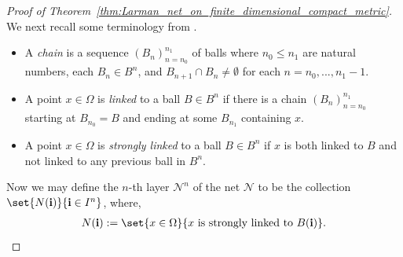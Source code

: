 \begin{proof}[Proof of Theorem~\ref{thm:Larman_net_on_finite_dimensional_compact_metric}]
    We next recall some terminology from \cite{Lar67}.
    \begin{itemize}
        \item A \textit{chain} is a sequence $(B_n)_{n = n_0}^{n_1}$ of balls where $n_0 \leq n_1$ are natural numbers, each $B_n \in B^n$, and $B_{n + 1} \cap B_{n} \neq \emptyset$ for each $n = n_0, ..., n_1 - 1$.
        \item A point $x \in \Omega$ is \textit{linked} to a ball $B \in B^n$ if there is a chain $(B_n)_{n = n_0}^{n_1}$ starting at $B_{n_0} = B$ and ending at some $B_{n_1}$ containing $x$.
        \item A point $x \in \Omega$ is \textit{strongly linked} to a ball $B \in B^n$ if $x$ is both linked to $B$ and not linked to any previous ball in $B^n$.
    \end{itemize}
    Now we may define the $n$-th layer $\mathcal{N}^n$ of the net $\mathcal{N}$ to be the collection $\set{N(\mathbf{i})}{\mathbf{i} \in I^n}$, where,
    \begin{align*}
        N(\mathbf{i}) := \set{x \in \Omega}{x \text{ is strongly linked to } B(\mathbf{i})}.
    \end{align*}


\end{proof}
